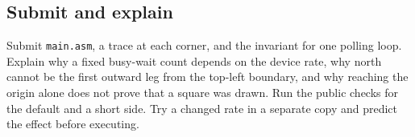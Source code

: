 \subsection{Submit and
  explain}\label{006-marsbot-square-assignment-submit-and-explain}

Submit \texttt{main.asm}, a trace at each corner, and the invariant for
one polling loop. Explain why a fixed busy-wait count depends on the
device rate, why north cannot be the first outward leg from the top-left
boundary, and why reaching the origin alone does not prove that a square
was drawn. Run the public checks for the default and a short side. Try a
changed rate in a separate copy and predict the effect before executing.
